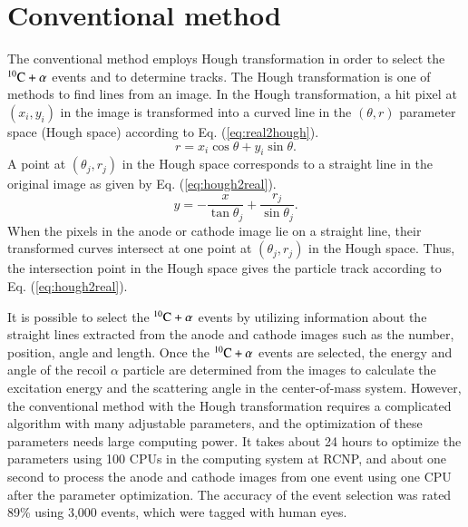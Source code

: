 \documentclass{jps-cp}
\begin{document}
\section{Conventional method}
The conventional method employs Hough transformation in order to
select the ${}^{10}\rm{C}+\alpha$ events and to determine tracks.
The Hough transformation is one of methods to find lines from an image.
In the Hough transformation, a hit pixel at $(x_{i}, y_{i})$ in the image
is transformed into
a curved line in the $(\theta, r)$ parameter space (Hough space)
according to Eq. (\ref{eq:real2hough}).
\begin{equation}
  \label{eq:real2hough}
  r = x_{i}\cos\theta+y_{i}\sin\theta. 
\end{equation}
A point at $(\theta_{j}, r_{j})$ in the Hough space corresponds to a straight line
in the original image as given by Eq. (\ref{eq:hough2real}).
\begin{equation}
  \label{eq:hough2real}
  y = -\frac{x}{\tan\theta_{j}}+\frac{r_{j}}{\sin\theta_{j}}. 
\end{equation}
When the pixels in the anode or cathode image lie on a straight line,
their transformed curves intersect at one point at $(\theta_{j}, r_{j})$ in the Hough space.
Thus, the intersection point in the Hough space gives the particle track according to Eq. (\ref{eq:hough2real}).

It is possible to select the ${}^{10}\rm{C}+\alpha$ events by
utilizing information about the straight lines extracted from the anode and cathode images such as
the number, position, angle and length.
Once the ${}^{10}\rm{C}+\alpha$ events are selected, the energy and angle of the recoil $\alpha$ particle
are determined from the images to calculate the excitation energy and the scattering angle in the center-of-mass system.
However, the conventional method with the Hough transformation requires a complicated algorithm with many adjustable parameters,
and the optimization of these parameters needs large computing power.
It takes about 24 hours to optimize the parameters using 100 CPUs
in the computing system at RCNP, 
and about one second to process the anode and cathode images from one event using one CPU after the parameter optimization.
The accuracy of the event selection was rated 89\% using 3,000 events,
which were tagged with human eyes.
\end{document}

